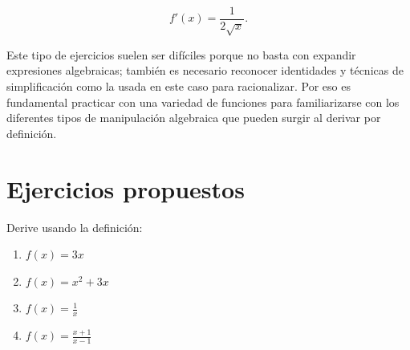 \documentclass{article}
\begin{document}
\[
f'(x)=\frac{1}{2\sqrt{x}}.
\]

Este tipo de ejercicios suelen ser difíciles porque no basta con expandir expresiones algebraicas; también es necesario reconocer identidades y técnicas de simplificación como la usada en este caso para racionalizar. Por eso es fundamental practicar con una variedad de funciones para familiarizarse con los diferentes tipos de manipulación algebraica que pueden surgir al derivar por definición.

 \section*{Ejercicios propuestos} 
Derive usando la definición:
\begin{enumerate}
    \item
    $
    f(x)=3x
    $

    \item 
    $
    f(x)=x^2+3x
    $

    \item
    $
    f(x)=\frac{1}{x}
    $

    \item
$
f(x)=\frac{x+1}{x-1}
$
\end{enumerate}
\end{document}
